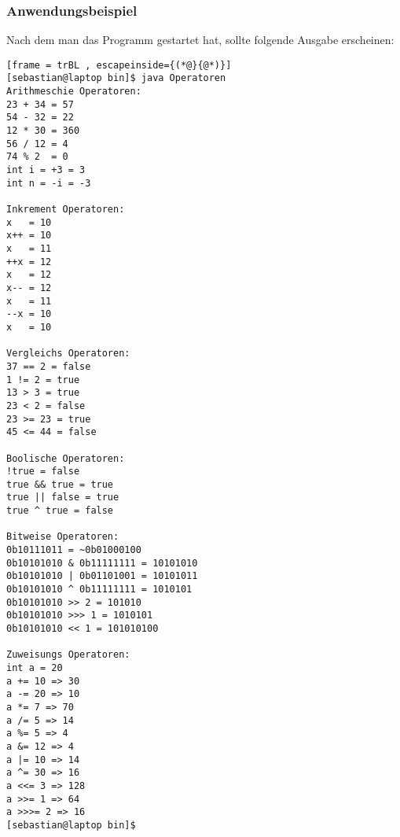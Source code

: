 \subsubsection{Anwendungsbeispiel}
Nach dem man das Programm gestartet hat, sollte folgende Ausgabe erscheinen:
\begin{lstlisting}[frame = trBL , escapeinside={(*@}{@*)}]
[sebastian@laptop bin]$ java Operatoren 
Arithmeschie Operatoren:
23 + 34 = 57
54 - 32 = 22
12 * 30 = 360
56 / 12 = 4
74 % 2  = 0
int i = +3 = 3
int n = -i = -3

Inkrement Operatoren:
x   = 10
x++ = 10
x   = 11
++x = 12
x   = 12
x-- = 12
x   = 11
--x = 10
x   = 10

Vergleichs Operatoren:
37 == 2 = false
1 != 2 = true
13 > 3 = true
23 < 2 = false
23 >= 23 = true
45 <= 44 = false

Boolische Operatoren:
!true = false
true && true = true
true || false = true
true ^ true = false

Bitweise Operatoren:
0b10111011 = ~0b01000100
0b10101010 & 0b11111111 = 10101010
0b10101010 | 0b01101001 = 10101011
0b10101010 ^ 0b11111111 = 1010101
0b10101010 >> 2 = 101010
0b10101010 >>> 1 = 1010101
0b10101010 << 1 = 101010100

Zuweisungs Operatoren:
int a = 20
a += 10 => 30
a -= 20 => 10
a *= 7 => 70
a /= 5 => 14
a %= 5 => 4
a &= 12 => 4
a |= 10 => 14
a ^= 30 => 16
a <<= 3 => 128
a >>= 1 => 64
a >>>= 2 => 16
[sebastian@laptop bin]$ 
\end{lstlisting}